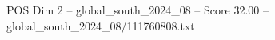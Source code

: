 \begin{textsample}{POS Dim 2 – global\_south\_2024\_08 – Score 32.00 – global\_south\_2024\_08/111760808.txt}
\end{textsample}
